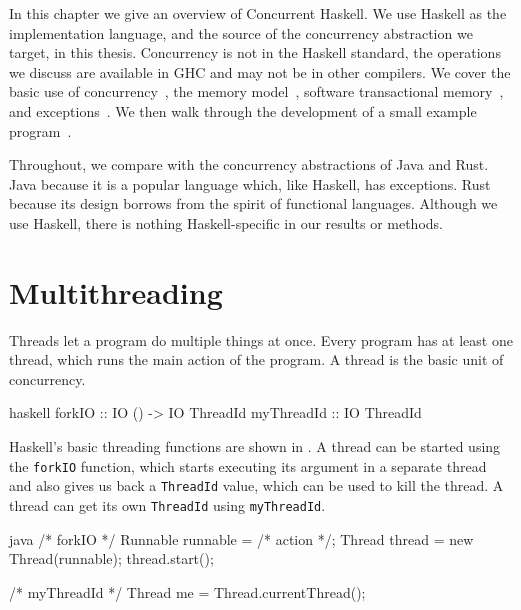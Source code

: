 In this chapter we give an overview of Concurrent
Haskell\cite{peytonjones2005,peytonjones1996}.  We use Haskell as the
implementation language, and the source of the concurrency abstraction
we target, in this thesis.  Concurrency is not in the Haskell
standard, the operations we discuss are available in GHC and may not
be in other compilers.  We cover the basic use of
concurrency~, the memory
model~, software transactional
memory~, and
exceptions~.  We then walk through the
development of a small example
program~.

Throughout, we compare with the concurrency abstractions of
Java\cite{lea1996} and Rust\cite{rust2011}.  Java because it is a
popular language which, like Haskell, has exceptions.  Rust because
its design borrows from the spirit of functional languages.  Although
we use Haskell, there is nothing Haskell-specific in our results or
methods.

\section{Multithreading}
\label{sec:concurrent_haskell-threads}

Threads let a program do multiple things at once.  Every program has
at least one thread, which runs the main action of the program.  A
thread is the basic unit of concurrency.

\begin{listing}
\centering
\begin{cminted}{haskell}
forkIO     :: IO () -> IO ThreadId
myThreadId :: IO ThreadId
\end{cminted}
\caption{Basic threading operations in Haskell.}\label{lst:basic_haskell}
\end{listing}

Haskell's basic threading functions are shown in
.  A thread can be started using the
\verb|forkIO| function, which starts executing its argument in a
separate thread and also gives us back a \verb|ThreadId| value, which
can be used to kill the thread.  A thread can get its own
\verb|ThreadId| using \verb|myThreadId|.

\begin{listing}
\centering
\begin{cminted}{java}
/* forkIO */
Runnable runnable = /* action */;
Thread thread = new Thread(runnable);
thread.start();

/* myThreadId */
Thread me = Thread.currentThread();
\end{cminted}
\caption{Basic threading operations in Java.}\label{lst:basic_java}
\end{listing}


